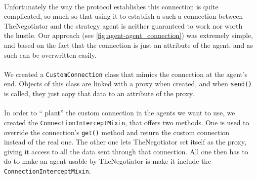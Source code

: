\documentclass[12pt]{article}
\numberwithin{equation}{section}
\newcommand{\quotes}[1]{\textquotedblleft{} #1\textquotedblright}
\begin{document}
			\paragraph*{}
				Unfortunately the way the protocol establishes this connection is quite complicated, so much so that using it to establish a such a connection between TheNegotiator and the strategy agent is neither guaranteed to work nor worth the hustle. %
				Our approach (see \cref{fig:agent-agent_connection}) was extremely simple, and based on the fact that the connection is just an attribute of the agent, and as such can be overwritten easily.

			\paragraph*{}
				We created a \texttt{CustomConnection} class that mimics the connection at the agent's end. Objects of this class are linked with a proxy when created, and when \texttt{send()} is called, they just copy that data to an attribute of the proxy.	%

			\paragraph*{}
				In order to \quotes{plant} the custom connection in the agents we want to use, we created the \texttt{ConnectionInterceptMixin}, that offers two methods. One is used to override the connection's \texttt{get()} method and return the custom connection instead of the real one. The other one lets TheNegotiator set itself as the proxy, giving it access to all the data sent through that connection. All one then has to do to make an agent usable by TheNegotiator is make it include the \texttt{ConnectionInterceptMixin}.
\end{document}

